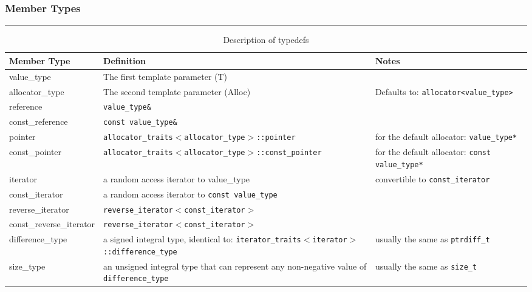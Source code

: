 \documentclass{report}
\begin{document}
\subsubsection{Member Types}
\hrule \vspace{3mm}
\begin{table}[H]
\centering
  \begin{tabular}{|l|l|l|}
\hline
\textbf{Member Type} & \textbf{Definition} & \textbf{Notes} \\
\hline
value\_type & The first template parameter (T) & \\
\hline
allocator\_type & The second template parameter (Alloc) & Defaults to: \texttt{allocator<value\_type>} \\
\hline
reference & \texttt{value\_type\&} & \\
\hline

const\_reference & \texttt{const value\_type\&} & \\
\hline
pointer & \texttt{allocator\_traits$<$allocator\_type$>$::pointer} & for the default allocator: \texttt{value\_type*} \\
\hline
const\_pointer & \texttt{allocator\_traits$<$allocator\_type$>$::const\_pointer} & \parbox{6cm}{for the default allocator: \texttt{const value\_type*}} \\
\hline
iterator & a random access iterator to value\_type & convertible to \texttt{const\_iterator} \\ 
\hline
const\_iterator & a random access iterator to \texttt{const value\_type} \\
\hline
reverse\_iterator & \texttt{reverse\_iterator$<$const\_iterator$>$} \\
\hline
const\_reverse\_iterator & \texttt{reverse\_iterator$<$const\_iterator$>$} \\ 
\hline
difference\_type & \parbox{6cm}{a signed integral type, identical to: \texttt{iterator\_traits$<$iterator$>$::difference\_type}} & usually the same as \texttt{ptrdiff\_t} \\
\hline
size\_type & \parbox{6cm}{an unsigned integral type that can represent any non-negative value of \texttt{difference\_type}} & usually the same as \texttt{size\_t} \\ 
\hline
\end{tabular}
\caption{Description of typedefs}
\label{tab:member_types}
\end{table}
\newpage
\end{document}
